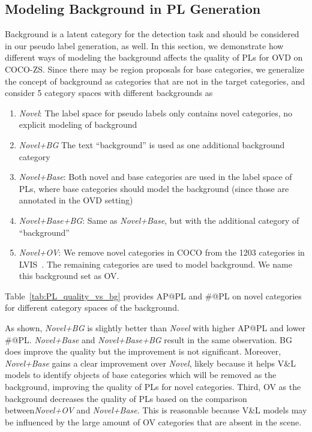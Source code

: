 \documentclass[runningheads]{llncs}
\begin{document}
\subsection{Modeling Background in PL Generation} \label{subsec:bg_texts}
Background is a latent category for the detection task and should be considered in our pseudo label generation, as well. In this section, we demonstrate how different ways of modeling the background affects the quality of PLs for OVD on COCO-ZS. Since there may be region proposals for base categories, we generalize the concept of background as categories that are not in the target categories, and consider 5 category spaces with different backgrounds as
\begin{enumerate}
    \item \emph{Novel}: The label space for pseudo labels only contains novel categories, no explicit modeling of background
    \item \emph{Novel+BG} The text ``background'' is used as one additional background category
    \item \emph{Novel+Base}: Both novel and base categories are used in the label space of PLs, where base categories should model the background (since those are annotated in the OVD setting)
    \item \emph{Novel+Base+BG}: Same as \emph{Novel+Base}, but with the additional category of ``background''
    \item \emph{Novel+OV}: We remove novel categories in COCO from the 1203 categories in LVIS~\cite{gupta2019lvis}. The remaining categories are used to model background. We name this background set as OV.
\end{enumerate}
Table~\ref{tab:PL_quality_vs_bg} provides AP@PL and \#@PL on novel categories for different category spaces of the background.

As shown, \emph{Novel+BG} is slightly better than \emph{Novel} with higher AP@PL and lower \#@PL. \emph{Novel+Base} and \emph{Novel+Base+BG} result in the same observation. BG does improve the quality but the improvement is not significant. Moreover, \emph{Novel+Base} gains a clear improvement over \emph{Novel}, likely because it helps V\&L models to identify objects of base categories which will be removed as the background, improving the quality of PLs for novel categories. Third, OV as the background decreases the quality of PLs based on the comparison between\emph{Novel+OV} and \emph{Novel+Base}. This is reasonable because V\&L models may be influenced by the large amount of OV categories that are absent in the scene.
\end{document}
